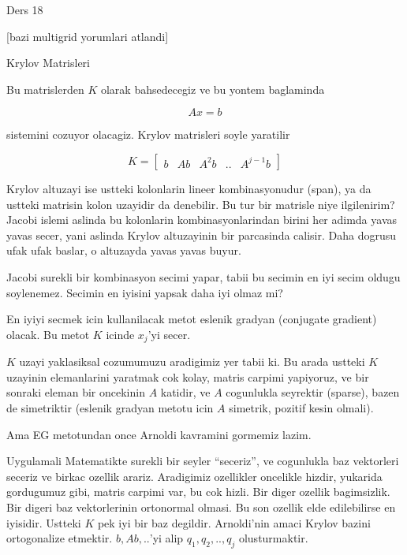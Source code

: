 \documentclass[12pt,fleqn]{article}\usepackage{../common}
\begin{document}
Ders 18

[bazi multigrid yorumlari atlandi]

Krylov Matrisleri 

Bu matrislerden $K$ olarak bahsedecegiz ve bu yontem baglaminda 

\[ Ax = b \]

sistemini cozuyor olacagiz. Krylov matrisleri soyle yaratilir

\[ K = \left[\begin{array}{rrrrr}
b & Ab & A^2b & .. & A^{j-1}b
\end{array}\right] \]

Krylov altuzayi ise ustteki kolonlarin lineer kombinasyonudur (span), ya da
ustteki matrisin kolon uzayidir da denebilir. Bu tur bir matrisle niye
ilgilenirim? Jacobi islemi aslinda bu kolonlarin kombinasyonlarindan birini
her adimda yavas yavas secer, yani aslinda Krylov altuzayinin bir
parcasinda calisir. Daha dogrusu ufak ufak baslar, o altuzayda yavas yavas
buyur.

Jacobi surekli bir kombinasyon secimi yapar, tabii bu secimin en iyi secim
oldugu soylenemez. Secimin en iyisini yapsak daha iyi olmaz mi? 

En iyiyi secmek icin kullanilacak metot eslenik gradyan (conjugate
gradient) olacak. Bu metot $K$ icinde $x_j$'yi secer. 

$K$ uzayi yaklasiksal cozumumuzu aradigimiz yer tabii ki. Bu arada ustteki
$K$ uzayinin elemanlarini yaratmak cok kolay, matris carpimi yapiyoruz, ve
bir sonraki eleman bir oncekinin $A$ katidir, ve $A$ cogunlukla seyrektir
(sparse), bazen de simetriktir (eslenik gradyan metotu icin $A$ simetrik,
pozitif kesin olmali).

Ama EG metotundan once Arnoldi kavramini gormemiz lazim. 

Uygulamali Matematikte surekli bir seyler ``seceriz'', ve cogunlukla baz
vektorleri seceriz ve birkac ozellik arariz. Aradigimiz ozellikler
oncelikle hizdir, yukarida gordugumuz gibi, matris carpimi var, bu cok
hizli. Bir diger ozellik bagimsizlik. Bir digeri baz vektorlerinin
ortonormal olmasi. Bu son ozellik elde edilebilirse en iyisidir. Ustteki
$K$ pek iyi bir baz degildir. Arnoldi'nin amaci Krylov bazini ortogonalize
etmektir. $b,Ab,..$'yi alip $q_1,q_2,..,q_j$ olusturmaktir.
\end{document}
